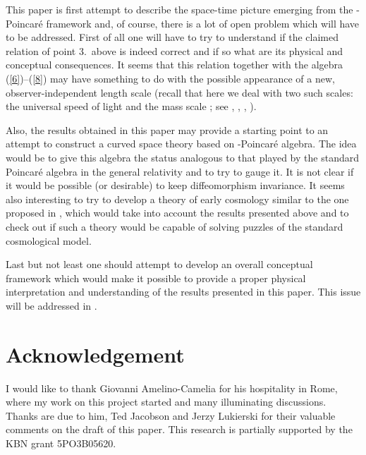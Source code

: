 \documentclass[a4paper,a4paper]{article}
\begin{document}
This paper is first attempt to describe the space-time picture emerging from the \myHighlight{$\kappa$}\coordHE{}-Poincar\'e framework and, of course, there is a lot of open problem which will have to be addressed. First of all one will have to try to understand if the claimed relation of point 3.~above is indeed correct and if so what are its physical and conceptual consequences. It seems that this relation together with the algebra (\ref{6})--(\ref{8}) may have something to do with the possible appearance of a new, observer-independent length scale (recall that here we deal with two such scales: the universal speed of light \coordHE{} and the mass scale \myHighlight{$\kappa$}\coordHE{}; see \cite{gac1}, \cite{gac2}, \cite{jkgminl}, \cite{rbgacjkg}).

Also, the results obtained in this paper may provide a starting point to an attempt to construct a curved space theory based on \myHighlight{$\kappa$}\coordHE{}-Poincar\'e algebra. The idea would be to give this algebra the status analogous to that played by the standard Poincar\'e algebra in the general relativity and to try to gauge it. It is not clear if it would be possible (or desirable) to keep diffeomorphism invariance. It seems also interesting to try to develop a theory of early cosmology similar to the one proposed in \cite{stjo}, which would take into account the results presented above and to check out if such a theory would be capable of solving  puzzles of the standard cosmological model.

Last but not least one should attempt to develop an overall conceptual framework which would make it possible to provide a proper physical interpretation and understanding of the results presented in this paper. This issue will be addressed in \cite{gacjkgfut}.










\section*{Acknowledgement} I would like to thank  Giovanni Amelino-Camelia for his hospitality in Rome, where my work on this project started  and many illuminating discussions. Thanks are due to him, Ted Jacobson and Jerzy Lukierski for their valuable comments on the draft of this paper. This research is partially supported by the   KBN grant 5PO3B05620.
\end{document}

